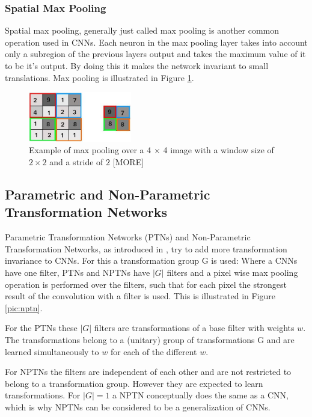 \documentclass{llncs}
\begin{document}
\subsubsection{Spatial Max Pooling}
Spatial max pooling, generally just called max pooling is another common operation used in CNNs.
Each neuron in the max pooling layer takes into account only a subregion of the previous
layers output and takes the maximum value of it to be it's output. By doing this it makes the network invariant to small translations. Max pooling is illustrated in Figure \ref{fig:maxpooling}.

\begin{figure}
	\begin{center}
		\includegraphics[width=0.40\textwidth]{result_images/maxpooling.jpg}
		\caption{Example of max pooling over a 4 $\times$ 4 image with a window size of $2 \times 2$ and a stride of $2$ [MORE]}
		\label{fig:maxpooling}
	\end{center}
\end{figure}

\subsection{Parametric and Non-Parametric Transformation Networks}

Parametric Transformation Networks (PTNs) and Non-Parametric Transformation Networks, as introduced in \cite{NPTN18}, try to add more transformation invariance to CNNs. For this a transformation group G is used:
Where a CNNs have one filter, PTNs and NPTNs have $|G|$ filters and a pixel wise max pooling operation is performed over the filters, such that for each pixel the strongest result of the convolution with a filter is used. This is illustrated in Figure \ref{pic:nptn}.

For the PTNs these $|G|$ filters are transformations of a base filter with weights $w$. The transformations belong to a (unitary) group of transformations G and are learned simultaneously to $w$ for each of the different $w$. 

For NPTNs the filters are independent of each other and are not restricted to belong to a transformation group. However they are expected to learn transformations.
For $|G|=1$ a NPTN conceptually does the same as a CNN, which is why NPTNs can be considered to be a generalization of CNNs. 
\end{document}
